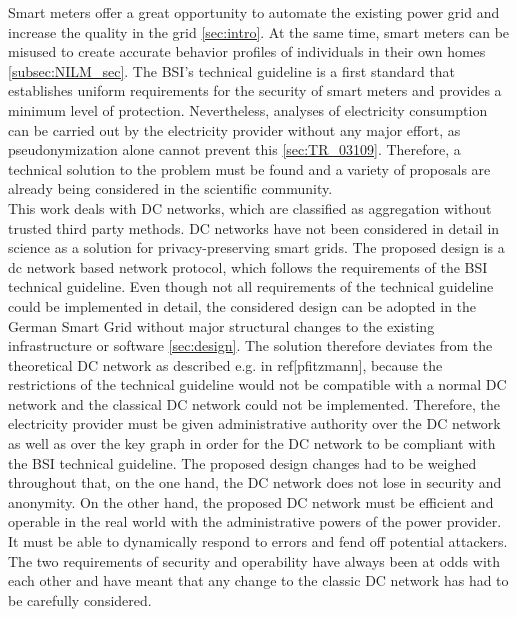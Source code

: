Smart meters offer a great opportunity to automate the existing power grid and increase the quality in the grid \ref{sec:intro}. At the same time, smart meters can be misused to create accurate behavior profiles of individuals in their own homes \ref{subsec:NILM_sec}. The BSI's technical guideline is a first standard that establishes uniform requirements for the security of smart meters and provides a minimum level of protection. Nevertheless, analyses of electricity consumption can be carried out by the electricity provider without any major effort, as pseudonymization alone cannot prevent this \ref{sec:TR_03109}. Therefore, a technical solution to the problem must be found and a variety of proposals are already being considered in the scientific community.\\ This work deals with DC networks, which are classified as aggregation without trusted third party methods. DC networks have not been considered in detail in science as a solution for privacy-preserving smart grids. The proposed design is a dc network based network protocol, which follows the requirements of the BSI technical guideline. Even though not all requirements of the technical guideline could be implemented in detail, the considered design can be adopted in the German Smart Grid without major structural changes to the existing infrastructure or software \ref{sec:design}. The solution therefore deviates from the theoretical DC network as described e.g. in ref[pfitzmann], because the restrictions of the technical guideline would not be compatible with a normal DC network and the classical DC network could not be implemented. Therefore, the electricity provider must be given administrative authority over the DC network as well as over the key graph in order for the DC network to be compliant with the BSI technical guideline. The proposed design changes had to be weighed throughout that, on the one hand, the DC network does not lose in security and anonymity. On the other hand, the proposed DC network must be efficient and operable in the real world with the administrative powers of the power provider. It must be able to dynamically respond to errors and fend off potential attackers. The two requirements of security and operability have always been at odds with each other and have meant that any change to the classic DC network has had to be carefully considered. \\
